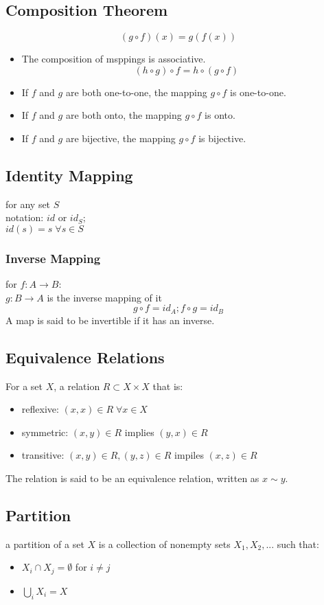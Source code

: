 \documentclass{article}
\begin{document}
\subsection{Composition Theorem}
$$(g\circ f)(x)=g(f(x))$$
\begin{itemize}
    \item The composition of msppings is associative.
        $$(h\circ g)\circ f=h\circ (g\circ f)$$
    \item If $f$ and $g$ are both one-to-one, the mapping $g\circ f$ is one-to-one.
    \item If $f$ and $g$ are both onto, the mapping $g\circ f$ is onto.
    \item If $f$ and $g$ are bijective, the mapping $g\circ f$ is bijective.
\end{itemize}

\subsection{Identity Mapping}
for any set $S$ \\
notation: $id$ or $id_S$; \\$id(s)=s \;\forall s\in S$
\subsubsection{Inverse Mapping}
for $f: A\rightarrow B$:\\
$g: B\rightarrow A$ is the inverse mapping of it\\
$$g\circ f=id_A; f\circ g=id_B$$
A map is said to be invertible if it has an inverse.

\subsection{Equivalence Relations}
For a set $X$, a relation $R\subset X\times X$ that is:
\begin{itemize}
    \item reflexive: $(x,x)\in R \;\forall x\in X$
    \item symmetric: $(x,y)\in R$ implies $ (y,x)\in R$
    \item transitive: $(x,y)\in R, (y,z)\in R$ impiles $(x,z)\in R$
\end{itemize}
The relation is said to be an equivalence relation, written as $x\sim y$.

\subsection{Partition}
a partition of a set $X$ is a collection of nonempty sets $X_1, X_2,...$ such that:
\begin{itemize}
    \item $X_i \cap X_j = \emptyset$ for $i\neq j$
    \item $\bigcup_i X_i=X$
\end{itemize}
\end{document}
